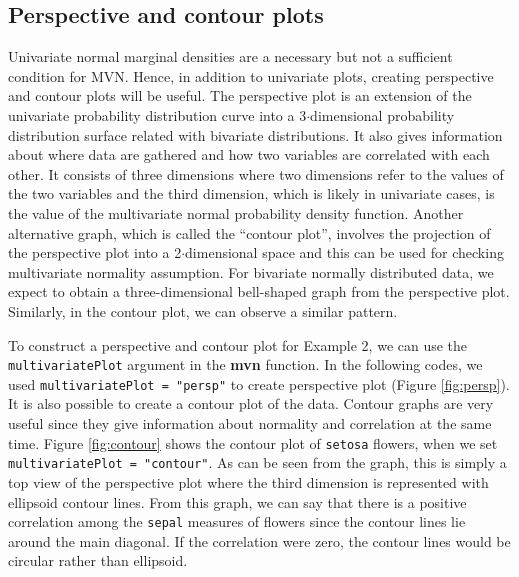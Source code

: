 \documentclass[11pt]{article}\usepackage[]{graphicx}\usepackage[]{color}
\begin{document}
\subsection{Perspective and contour plots} \label{subsec:PerspCont}

Univariate normal marginal densities are a necessary but not a sufficient condition for MVN. Hence, in addition to univariate plots, creating perspective and contour plots will be useful. The perspective plot is an extension of the univariate probability distribution curve into a 3$\cdot$dimensional probability distribution surface related with bivariate distributions. It also gives information about where data are gathered and how two variables are correlated with each other. It consists of three dimensions where two dimensions refer to the values of the two variables and the third dimension, which is likely in univariate cases, is the value of the multivariate normal probability density function. Another alternative graph, which is called the ``contour plot'', involves the projection of the perspective plot into a 2$\cdot$dimensional space and this can be used for checking multivariate normality assumption. For bivariate normally distributed data, we expect to obtain a three-dimensional bell-shaped graph from the perspective plot. Similarly, in the contour plot, we can observe a similar pattern.

To construct a perspective and contour plot for Example 2, we can use the \texttt{multivariatePlot} argument in the \textbf{mvn} function. In the following codes, we used \texttt{multivariatePlot = "persp"} to create perspective plot (Figure \ref{fig:persp}). It is also possible to create a contour plot of the data. Contour graphs are very useful since they give information about normality and correlation at the same time. Figure \ref{fig:contour} shows the contour plot of \texttt{setosa} flowers, when we set \texttt{multivariatePlot = "contour"}.  As can be seen from the graph, this is simply a top view of the perspective plot where the third dimension is represented with ellipsoid contour lines.  From this graph, we can say that there is a positive correlation among the \texttt{sepal} measures of flowers since the contour lines lie around the main diagonal. If the correlation were zero, the contour lines would be circular rather than ellipsoid.
\end{document}
